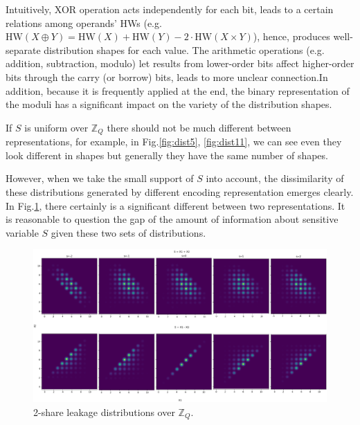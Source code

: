\documentclass{llncs}
\begin{document}
Intuitively, XOR operation acts independently for each bit, leads to a certain  relations among operands' HWs (e.g. $\text{HW}(X\oplus Y) = \text{HW}(X) + \text{HW}(Y) - 2\cdot\text{HW}(X\times Y)$), hence, produces well-separate distribution shapes for each value. The arithmetic operations (e.g. addition, subtraction, modulo) let results from lower-order bits affect higher-order bits through the carry (or borrow) bits, leads to more unclear connection.In addition, because it is frequently applied at the end, the binary representation of the moduli has a significant impact on the variety of the distribution shapes.

If $S$ is uniform over $\mathbb{Z}_Q$ there should not be much different between representations, for example, in Fig.\ref{fig:dist5}, \ref{fig:dist11}, we can see even they look different in shapes but generally they have the same number of shapes.
 
However, when we take the small support of $S$ into account, the dissimilarity of these distributions generated by different encoding representation emerges clearly. In  Fig.\ref{fig:dist}, there certainly is a significant different between two representations. It is reasonable to question the gap of the amount of information about sensitive variable $S$ given these two sets of distributions.
\begin{figure}
	\centering \includegraphics[scale=0.25]{figures/3329_dist_modes.png}
	\caption{2-share leakage distributions over $\mathbb{Z}_Q$.}\label{fig:dist}\vspace*{-0.0cm}
\end{figure}
\end{document}
